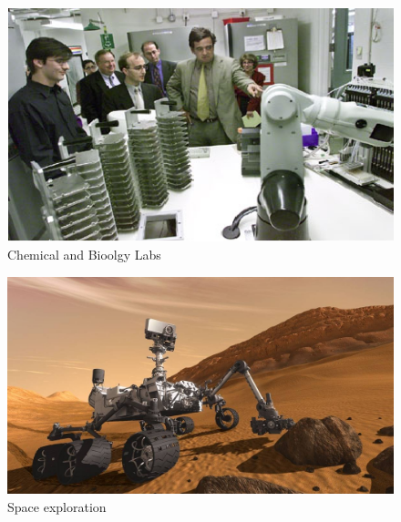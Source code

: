 \documentclass{beamer}
\begin{document}
\begin{frame}
\begin{columns}[t]
        \begin{column}{.5\textwidth}
            \begin{figure}[H]
                \centering
                \includegraphics[width=\linewidth, height=.25\textheight, keepaspectratio]{../images/robo-lab.png}
                \caption[Boston dynamics robot (spot)]{Chemical and Bioolgy Labs}
            \end{figure}
            \begin{figure}[H]
                \centering
                \includegraphics[width=\linewidth, height=.25\textheight, keepaspectratio]{../images/space-robots.jpg}
                \caption[Boston dynamics robot (spot)]{Space exploration}
            \end{figure}
        \end{column}

    \end{columns}
\end{frame}
\end{document}
